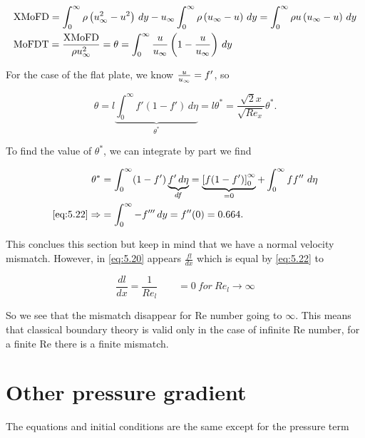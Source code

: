 			\begin{equation}
			\begin{aligned}
				&\mbox{XMoFD} =  \int_0^\infty \rho \left(  u_\infty ^2 - u^2 \right) \, dy - u_\infty \int_0^\infty \rho \left( u_\infty -u \right)\, dy 
= \int_0^\infty \rho u \left(u_\infty - u\right) \,  dy\\
				&\mbox{MoFDT} = \frac{\mbox{XMoFD}}{\rho u_\infty ^2} = \theta = \int_0^\infty \frac{ u}{u_\infty} \left( 1 - \frac{u}{u_\infty} \right)\, dy
			\end{aligned}
			\end{equation}
			
			For the case of the flat plate, we know $\frac{u}{u_\infty} = f'$, so
			
			\begin{equation}
				\theta = l \underbrace{\int _0^\infty f' (1-f') \, d\eta}_{\theta ^*} = l\theta ^* = \frac{\sqrt{2}x}{\sqrt{Re_x}} \theta ^*.
			\end{equation}
			
			To find the value of $\theta ^*$, we can integrate by part we find
			
			\begin{equation}
			\begin{aligned}
				\theta ^* &= \int _0^\infty (1-f') \underbrace{f' \, d\eta}_{df} = \underbrace{\left[ f (1-f') \right]_0^\infty}_{=0} + \int_0^\infty f f'' \ d\eta\\
				\eqref{eq:5.22} \Rightarrow &= \int_0^\infty - f''' \, dy = f''(0) = 0.664.
			\end{aligned}
			\end{equation}
			
			This conclues this section but keep in mind that we have a normal velocity mismatch. However, in \eqref{eq:5.20} appears $\frac{fl}{dx}$ which is equal by \eqref{eq:5.22} to 
			
			\begin{equation}
				\frac{dl}{dx} = \frac{1}{Re_l}\qquad =0 \ for \ Re_l \rightarrow \infty
			\end{equation}
			
			So we see that the mismatch disappear for Re number going to $\infty$. This means that classical boundary theory is valid only in the case of infinite Re number, for a finite Re there is a finite mismatch. 
			
			
\section{Other pressure gradient}
	The equations and initial conditions are the same except for the pressure term
	
